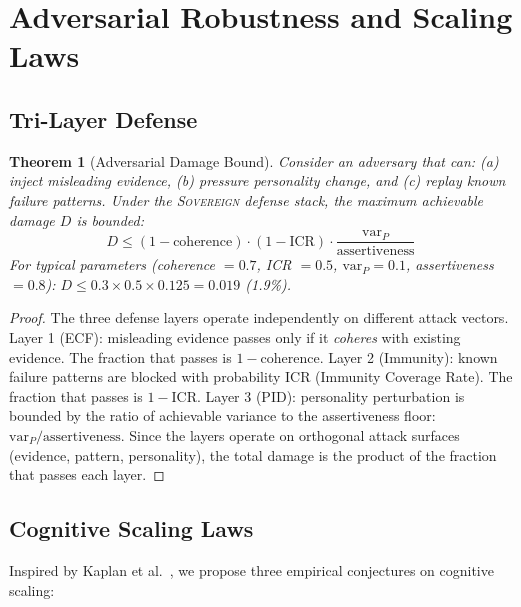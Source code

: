 \documentclass[11pt,a4paper]{article}
\newtheorem{theorem}{Theorem}
\begin{document}
\section{Adversarial Robustness and Scaling Laws}
\label{sec:adversarial}

\subsection{Tri-Layer Defense}

\begin{theorem}[Adversarial Damage Bound]
\label{thm:adversarial}
Consider an adversary that can: (a) inject misleading evidence,
(b) pressure personality change, and (c) replay known failure patterns.
Under the \textsc{Sovereign} defense stack, the maximum achievable
damage $D$ is bounded:
\begin{equation}
  D \leq (1 - \text{coherence}) \cdot (1 - \text{ICR}) \cdot
  \frac{\text{var}_P}{\text{assertiveness}}
  \label{eq:adversarial}
\end{equation}
For typical parameters (coherence $= 0.7$, ICR $= 0.5$,
$\text{var}_P = 0.1$, assertiveness $= 0.8$):
$D \leq 0.3 \times 0.5 \times 0.125 = 0.019$ (1.9\%).
\end{theorem}

\begin{proof}
The three defense layers operate independently on different attack
vectors. Layer 1 (ECF): misleading evidence passes only if it
\emph{coheres} with existing evidence. The fraction that passes is
$1 - \text{coherence}$. Layer 2 (Immunity): known failure patterns are
blocked with probability ICR (Immunity Coverage Rate). The fraction
that passes is $1 - \text{ICR}$. Layer 3 (PID): personality perturbation
is bounded by the ratio of achievable variance to the assertiveness
floor: $\text{var}_P / \text{assertiveness}$.
Since the layers operate on orthogonal attack surfaces (evidence,
pattern, personality), the total damage is the product of the
fraction that passes each layer.
\end{proof}

\subsection{Cognitive Scaling Laws}

Inspired by Kaplan et al.~\cite{kaplan2020}, we propose three empirical
conjectures on cognitive scaling:
\end{document}
